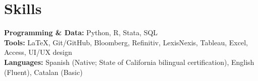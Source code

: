 \documentclass[10.5pt]{article} %
\begin{document}
\section*{Skills}

\textbf{Programming \& Data:} Python, R, Stata, SQL \\
\textbf{Tools:} \LaTeX, Git/GitHub, Bloomberg, Refinitiv, LexisNexis, Tableau, Excel, Access, UI/UX design \\
\textbf{Languages:} Spanish (Native; State of California bilingual certification), English (Fluent), Catalan (Basic)

\end{document}
